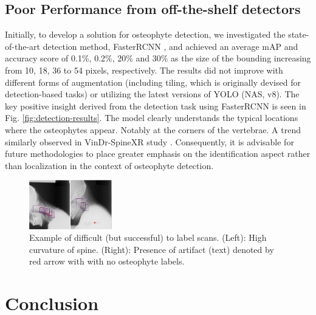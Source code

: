 \documentclass{article}
\begin{document}
\subsection{Poor Performance from off-the-shelf detectors}
\label{detection}
 Initially, to develop a solution for osteophyte detection, we investigated the state-of-the-art detection method, FasterRCNN \cite{girshick2014rich}, and achieved an average mAP and accuracy score of 0.1\%, 0.2\%, 20\% and 30\% as the size of the bounding increasing from 10, 18, 36 to 54 pixels, respectively.
 The results did not improve with different forms of augmentation (including tiling, which is originally devised for detection-based tasks) or utilizing the latest versions of YOLO (NAS, v8). The key positive insight derived from the detection task using FasterRCNN is seen in Fig. \ref{fig:detection-results}. The model clearly understands the typical locations where the osteophytes appear.
 Notably at the corners of the vertebrae. A trend similarly observed in VinDr-SpineXR study \cite{nguyen2021vindr}. Consequently, it is advisable for future methodologies to place greater emphasis on the identification aspect rather than localization in the context of osteophyte detection.

\begin{figure}
    \centering
    \includegraphics[width=0.32\textwidth]{images/Curvature.png}
    \caption{Example of difficult (but successful) to label scans. (Left): High curvature of spine. (Right): Presence of artifact  (text) denoted by red arrow with  with no osteophyte labels.}
    \label{fig:difficult}
\end{figure}

\section{Conclusion}
\end{document}
